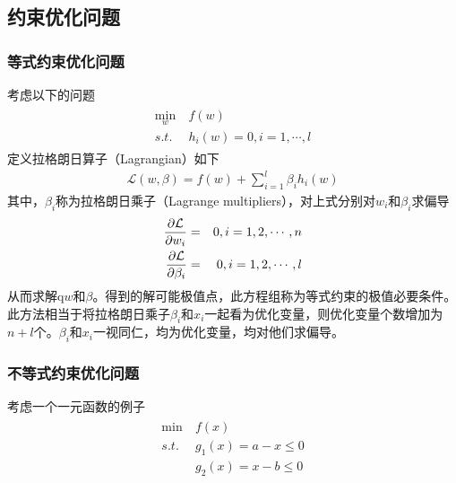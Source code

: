 \subsection{约束优化问题}
\subsubsection{等式约束优化问题}
考虑以下的问题
\begin{eqnarray}
\begin{aligned}
\min_w &\ f(w)\\
s.t. &\ h_i(w)=0,i=1,\cdots,l
\end{aligned}
\end{eqnarray}
定义拉格朗日算子（Lagrangian）如下
\begin{eqnarray}
\mathcal{L}(w,\beta)=f(w)+\sum_{i=1}^l\beta_ih_i(w)
\end{eqnarray}
其中，$\beta_i$称为拉格朗日乘子（Lagrange multipliers），对上式分别对$w_i$和$\beta_i$求偏导
\begin{eqnarray}
\frac{\partial\cal{L}}{\partial w_i}&=&0,i=1,2,\cdots,n\\
\frac{\partial\cal{L}}{\partial \beta_i}&=&0,i=1,2,\cdots,l\\
\end{eqnarray}
从而求解q$w$和$\beta$。得到的解可能极值点，此方程组称为等式约束的极值必要条件。此方法相当于将拉格朗日乘子$\beta_i$和$x_i$一起看为优化变量，则优化变量个数增加为$n+l$个。$\beta_i$和$x_i$一视同仁，均为优化变量，均对他们求偏导。

\subsubsection{不等式约束优化问题}
考虑一个一元函数的例子
\begin{eqnarray}
\begin{aligned}
\min &\ f(x)\\
s.t. &\ g_1(x)=a-x\leq 0\\
&\ g_2(x)=x-b\leq 0
\end{aligned}
\end{eqnarray}

